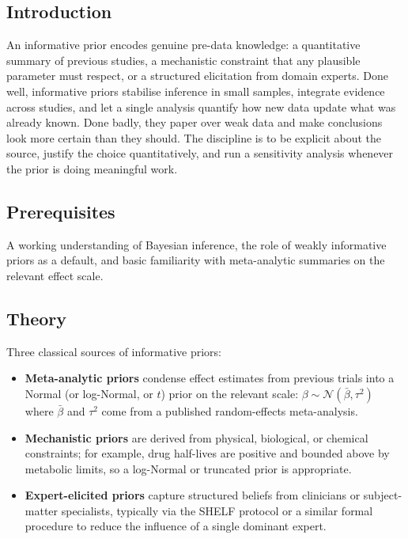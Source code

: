 \documentclass[
]{article}
\author{}
\date{\vspace{-2.5em}}
\providecommand{\tightlist}{%
  \setlength{\itemsep}{0pt}\setlength{\parskip}{0pt}}
\begin{document}
\subsection{Introduction}\label{introduction}

An informative prior encodes genuine pre-data knowledge: a quantitative
summary of previous studies, a mechanistic constraint that any plausible
parameter must respect, or a structured elicitation from domain experts.
Done well, informative priors stabilise inference in small samples,
integrate evidence across studies, and let a single analysis quantify
how new data update what was already known. Done badly, they paper over
weak data and make conclusions look more certain than they should. The
discipline is to be explicit about the source, justify the choice
quantitatively, and run a sensitivity analysis whenever the prior is
doing meaningful work.

\subsection{Prerequisites}\label{prerequisites}

A working understanding of Bayesian inference, the role of weakly
informative priors as a default, and basic familiarity with
meta-analytic summaries on the relevant effect scale.

\subsection{Theory}\label{theory}

Three classical sources of informative priors:

\begin{itemize}
\tightlist
\item
  \textbf{Meta-analytic priors} condense effect estimates from previous
  trials into a Normal (or log-Normal, or \(t\)) prior on the relevant
  scale: \(\beta \sim \mathcal N(\bar\beta, \tau^2)\) where
  \(\bar\beta\) and \(\tau^2\) come from a published random-effects
  meta-analysis.
\item
  \textbf{Mechanistic priors} are derived from physical, biological, or
  chemical constraints; for example, drug half-lives are positive and
  bounded above by metabolic limits, so a log-Normal or truncated prior
  is appropriate.
\item
  \textbf{Expert-elicited priors} capture structured beliefs from
  clinicians or subject-matter specialists, typically via the SHELF
  protocol or a similar formal procedure to reduce the influence of a
  single dominant expert.
\end{itemize}
\end{document}
